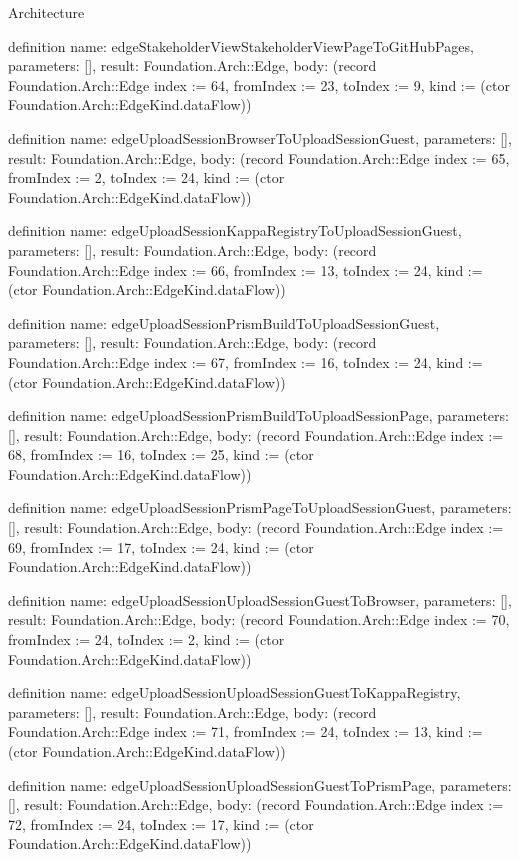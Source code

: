 \begin{lexlean}{Architecture}
\begin{semanticmodule}
definition{
  name: edgeStakeholderViewStakeholderViewPageToGitHubPages,
  parameters: [],
  result: Foundation.Arch::Edge,
  body: (record Foundation.Arch::Edge {index := 64, fromIndex := 23, toIndex := 9, kind := (ctor Foundation.Arch::EdgeKind.dataFlow)})
}

definition{
  name: edgeUploadSessionBrowserToUploadSessionGuest,
  parameters: [],
  result: Foundation.Arch::Edge,
  body: (record Foundation.Arch::Edge {index := 65, fromIndex := 2, toIndex := 24, kind := (ctor Foundation.Arch::EdgeKind.dataFlow)})
}

definition{
  name: edgeUploadSessionKappaRegistryToUploadSessionGuest,
  parameters: [],
  result: Foundation.Arch::Edge,
  body: (record Foundation.Arch::Edge {index := 66, fromIndex := 13, toIndex := 24, kind := (ctor Foundation.Arch::EdgeKind.dataFlow)})
}

definition{
  name: edgeUploadSessionPrismBuildToUploadSessionGuest,
  parameters: [],
  result: Foundation.Arch::Edge,
  body: (record Foundation.Arch::Edge {index := 67, fromIndex := 16, toIndex := 24, kind := (ctor Foundation.Arch::EdgeKind.dataFlow)})
}

definition{
  name: edgeUploadSessionPrismBuildToUploadSessionPage,
  parameters: [],
  result: Foundation.Arch::Edge,
  body: (record Foundation.Arch::Edge {index := 68, fromIndex := 16, toIndex := 25, kind := (ctor Foundation.Arch::EdgeKind.dataFlow)})
}

definition{
  name: edgeUploadSessionPrismPageToUploadSessionGuest,
  parameters: [],
  result: Foundation.Arch::Edge,
  body: (record Foundation.Arch::Edge {index := 69, fromIndex := 17, toIndex := 24, kind := (ctor Foundation.Arch::EdgeKind.dataFlow)})
}

definition{
  name: edgeUploadSessionUploadSessionGuestToBrowser,
  parameters: [],
  result: Foundation.Arch::Edge,
  body: (record Foundation.Arch::Edge {index := 70, fromIndex := 24, toIndex := 2, kind := (ctor Foundation.Arch::EdgeKind.dataFlow)})
}

definition{
  name: edgeUploadSessionUploadSessionGuestToKappaRegistry,
  parameters: [],
  result: Foundation.Arch::Edge,
  body: (record Foundation.Arch::Edge {index := 71, fromIndex := 24, toIndex := 13, kind := (ctor Foundation.Arch::EdgeKind.dataFlow)})
}

definition{
  name: edgeUploadSessionUploadSessionGuestToPrismPage,
  parameters: [],
  result: Foundation.Arch::Edge,
  body: (record Foundation.Arch::Edge {index := 72, fromIndex := 24, toIndex := 17, kind := (ctor Foundation.Arch::EdgeKind.dataFlow)})
}


\end{semanticmodule}
\end{lexlean}
